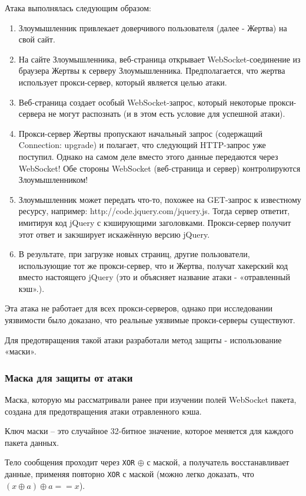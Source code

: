 Атака выполнялась следующим образом:
\begin{enumerate}
\item Злоумышленник привлекает доверчивого пользователя (далее - Жертва) на свой сайт.
\item На сайте Злоумышленника, веб-страница открывает WebSocket-соединение из браузера Жертвы к серверу Злоумышленника. Предполагается, что жертва использует прокси-сервер, который является целью атаки.
\item Веб-страница создает особый WebSocket-запрос, который некоторые прокси-сервера не могут распознать (и в этом есть условие для успешной атаки).
\item Прокси-сервер Жертвы пропускают начальный запрос (содержащий Connection: upgrade) и полагает, что следующий HTTP-запрос уже поступил. Однако на самом деле вместо этого данные передаются через WebSocket! Обе стороны WebSocket (веб-страница и сервер) контролируются Злоумышленником!
\item Злоумышленник может передать что-то, похожее на GET-запрос к известному ресурсу, например: http://code.jquery.com/jquery.js. Тогда сервер ответит, имитируя код jQuery с кэширующими заголовками. Прокси-сервер получит этот ответ и закэширует искажённую версию jQuery.
\item В результате, при загрузке новых страниц, другие пользователи, использующие тот же прокси-сервер, что и Жертва, получат хакерский код вместо настоящего jQuery (это и объясняет название атаки - «отравленный кэш».).
\end{enumerate}

Эта атака не работает для всех прокси-серверов, однако при исследовании уязвимости было доказано, что реальные уязвимые прокси-серверы существуют. 

Для предотвращения такой атаки разработали метод защиты - использование «маски».

\subsubsection{Маска для защиты от атаки}

Маска, которую мы рассматривали ранее при изучении полей WebSocket пакета, создана для предотвращения атаки отравленного кэша. 

Ключ маски -- это случайное 32-битное значение, которое меняется для каждого пакета данных.

Тело сообщения проходит через \texttt{XOR} $\oplus$ с маской, а получатель восстанавливает данные, применяя повторно \texttt{XOR} с маской (можно легко доказать, что $(x \oplus a) \oplus a == x$).

